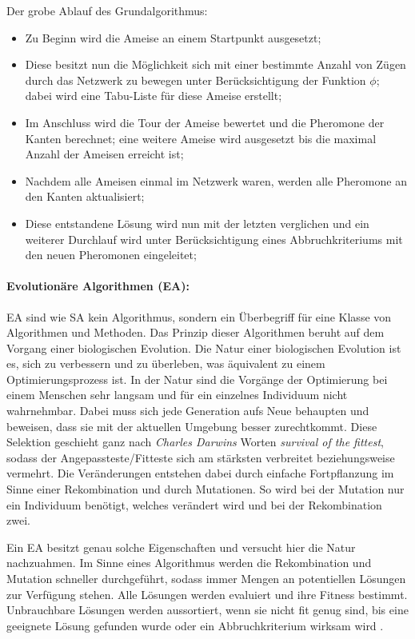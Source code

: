 \noindent
Der grobe Ablauf des Grundalgorithmus: 
\begin{itemize}
	\item Zu Beginn wird die Ameise an einem Startpunkt ausgesetzt;
	\item Diese besitzt nun die Möglichkeit sich mit einer bestimmte Anzahl von Zügen durch das Netzwerk zu bewegen unter Berücksichtigung der Funktion $\phi$; dabei wird eine Tabu-Liste für diese Ameise erstellt; 
	\item Im Anschluss wird die Tour der Ameise bewertet und
	die Pheromone der Kanten berechnet; eine weitere Ameise wird ausgesetzt bis die maximal Anzahl der Ameisen erreicht ist;
	\item Nachdem alle Ameisen einmal im Netzwerk waren, werden alle Pheromone an den Kanten aktualisiert; 
	\item Diese entstandene Lösung wird nun mit der letzten verglichen und ein weiterer Durchlauf wird unter Berücksichtigung eines Abbruchkriteriums mit den neuen Pheromonen eingeleitet; 
\end{itemize}

\paragraph{Evolutionäre Algorithmen (EA):}

EA sind wie SA kein Algorithmus, sondern ein Überbegriff für eine Klasse von Algorithmen und Methoden. 
Das Prinzip dieser Algorithmen beruht auf dem Vorgang einer biologischen Evolution. 
Die Natur einer biologischen Evolution ist es, sich zu verbessern und zu überleben, was äquivalent zu einem Optimierungsprozess ist. 
In der Natur sind die Vorgänge der Optimierung bei einem Menschen sehr langsam und für ein einzelnes Individuum nicht wahrnehmbar. 
Dabei muss sich jede Generation aufs Neue behaupten und beweisen, dass sie mit der aktuellen Umgebung besser zurechtkommt. 
Diese Selektion geschieht ganz nach \textit{Charles Darwins} Worten \textit{survival of the fittest}, sodass der Angepassteste/Fitteste sich am stärksten verbreitet beziehungsweise vermehrt. 
Die Veränderungen entstehen dabei durch einfache Fortpflanzung im Sinne einer Rekombination und durch Mutationen. 
So wird bei der Mutation nur ein Individuum benötigt, welches verändert wird und bei der Rekombination zwei. 

\noindent
Ein EA besitzt genau solche Eigenschaften und versucht hier die Natur nachzuahmen. 
Im Sinne eines Algorithmus werden die Rekombination und Mutation schneller durchgeführt, sodass immer Mengen an potentiellen Lösungen zur Verfügung stehen. 
Alle Lösungen werden evaluiert und ihre Fitness bestimmt. 
Unbrauchbare Lösungen werden aussortiert, wenn sie nicht fit genug sind, bis eine geeignete Lösung gefunden wurde oder ein Abbruchkriterium wirksam wird \cite{isl2008ea, beyer2001evolution}. 

